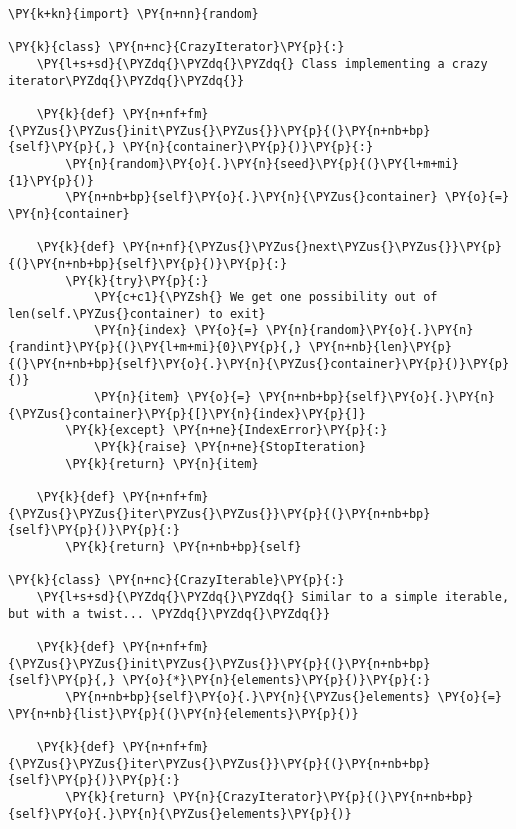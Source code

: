 \begin{Verbatim}[label=\makebox{\url{https://bitbucket.org/lbaldini/programming/src/tip/snippets/crazy\_iterator.py}},commandchars=\\\{\}]
\PY{k+kn}{import} \PY{n+nn}{random}

\PY{k}{class} \PY{n+nc}{CrazyIterator}\PY{p}{:}
    \PY{l+s+sd}{\PYZdq{}\PYZdq{}\PYZdq{} Class implementing a crazy iterator\PYZdq{}\PYZdq{}\PYZdq{}}
    
    \PY{k}{def} \PY{n+nf+fm}{\PYZus{}\PYZus{}init\PYZus{}\PYZus{}}\PY{p}{(}\PY{n+nb+bp}{self}\PY{p}{,} \PY{n}{container}\PY{p}{)}\PY{p}{:}
        \PY{n}{random}\PY{o}{.}\PY{n}{seed}\PY{p}{(}\PY{l+m+mi}{1}\PY{p}{)}
        \PY{n+nb+bp}{self}\PY{o}{.}\PY{n}{\PYZus{}container} \PY{o}{=} \PY{n}{container}
    
    \PY{k}{def} \PY{n+nf}{\PYZus{}\PYZus{}next\PYZus{}\PYZus{}}\PY{p}{(}\PY{n+nb+bp}{self}\PY{p}{)}\PY{p}{:}
        \PY{k}{try}\PY{p}{:}
            \PY{c+c1}{\PYZsh{} We get one possibility out of len(self.\PYZus{}container) to exit}
            \PY{n}{index} \PY{o}{=} \PY{n}{random}\PY{o}{.}\PY{n}{randint}\PY{p}{(}\PY{l+m+mi}{0}\PY{p}{,} \PY{n+nb}{len}\PY{p}{(}\PY{n+nb+bp}{self}\PY{o}{.}\PY{n}{\PYZus{}container}\PY{p}{)}\PY{p}{)}
            \PY{n}{item} \PY{o}{=} \PY{n+nb+bp}{self}\PY{o}{.}\PY{n}{\PYZus{}container}\PY{p}{[}\PY{n}{index}\PY{p}{]}
        \PY{k}{except} \PY{n+ne}{IndexError}\PY{p}{:}
            \PY{k}{raise} \PY{n+ne}{StopIteration}
        \PY{k}{return} \PY{n}{item}
    
    \PY{k}{def} \PY{n+nf+fm}{\PYZus{}\PYZus{}iter\PYZus{}\PYZus{}}\PY{p}{(}\PY{n+nb+bp}{self}\PY{p}{)}\PY{p}{:}
        \PY{k}{return} \PY{n+nb+bp}{self}

\PY{k}{class} \PY{n+nc}{CrazyIterable}\PY{p}{:}
    \PY{l+s+sd}{\PYZdq{}\PYZdq{}\PYZdq{} Similar to a simple iterable, but with a twist... \PYZdq{}\PYZdq{}\PYZdq{}}
    
    \PY{k}{def} \PY{n+nf+fm}{\PYZus{}\PYZus{}init\PYZus{}\PYZus{}}\PY{p}{(}\PY{n+nb+bp}{self}\PY{p}{,} \PY{o}{*}\PY{n}{elements}\PY{p}{)}\PY{p}{:}
        \PY{n+nb+bp}{self}\PY{o}{.}\PY{n}{\PYZus{}elements} \PY{o}{=} \PY{n+nb}{list}\PY{p}{(}\PY{n}{elements}\PY{p}{)}
    
    \PY{k}{def} \PY{n+nf+fm}{\PYZus{}\PYZus{}iter\PYZus{}\PYZus{}}\PY{p}{(}\PY{n+nb+bp}{self}\PY{p}{)}\PY{p}{:}
        \PY{k}{return} \PY{n}{CrazyIterator}\PY{p}{(}\PY{n+nb+bp}{self}\PY{o}{.}\PY{n}{\PYZus{}elements}\PY{p}{)}
\end{Verbatim}